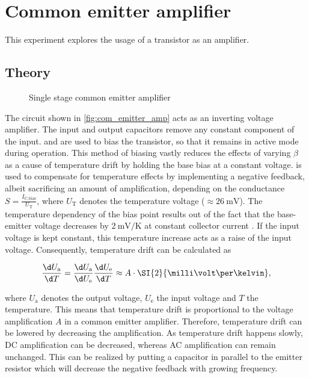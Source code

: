 \chapter{Common emitter amplifier}
This experiment explores the usage of a transistor as an amplifier.

\section{Theory}\label{sec:theory}
\begin{figure}[tbp]
	\centering
	\caption[Single Stage Common Emitter Amplifier]{Single stage common emitter amplifier}
	\label{fig:com_emitter_amp}
\end{figure}
The circuit shown in \autoref{fig:com_emitter_amp} acts as an inverting voltage amplifier.
The input and output capacitors remove any constant component of the input.
 and  are used to bias the transistor, so that it remains in active mode during operation.
This method of biasing vastly reduces the effects of varying $\beta$ as a cause of temperature drift by holding the base bias at a constant voltage.
 is used to compensate for temperature effects by implementing a negative feedback, albeit sacrificing an amount of amplification, depending on the conductance $S=\frac{I_\text{C,bias}}{U_\text{T}}$, where $U_\text{T}$ denotes the temperature voltage ($\approx\SI{26}{\milli\volt}$).
The temperature dependency of the bias point results out of the fact that the base-emitter voltage  decreases by $\SI{2}{\milli\volt\per\kelvin}$ at constant collector current .
If the input voltage is kept constant, this temperature increase acts as a raise of the input voltage.
Consequently, temperature drift can be calculated as

\begin{equation}
	\frac{\d U_\text{a}}{\d T}=\frac{\d U_\text{a}}{\d U_\text{e}}\frac{\d U_\text{e}}{\d T}\approx A\cdot\SI{2}{\milli\volt\per\kelvin},
\end{equation}

where $U_\text{a}$ denotes the output voltage, $U_\text{e}$ the input voltage and $T$ the temperature.
This means that temperature drift is proportional to the voltage amplification $A$ in a common emitter amplifier.
Therefore, temperature drift can be lowered by decreasing the amplification.
As temperature drift happens slowly, DC amplification can be decreased, whereas AC amplification can remain unchanged.
This can be realized by putting a capacitor  in parallel to the emitter resistor  which will decrease the negative feedback with growing frequency.

